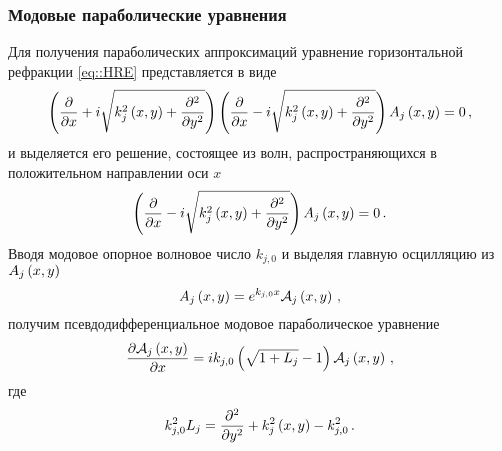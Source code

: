 \documentclass[../document.tex]{subfiles}
\begin{document}
        \subsubsection{Модовые параболические уравнения}
            \par Для получения параболических аппроксимаций уравнение горизонтальной рефракции \eqref{eq::HRE} представляется в виде
            \begin{equation}
                \left(\frac{\partial}{\partial x}+i\sqrt{k_j^2\left(x,y\right)+\frac{\partial^2}{\partial y^2}}\right)\left(\frac{\partial}{\partial x}-i\sqrt{k_j^2\left(x,y\right)+\frac{\partial^2}{\partial y^2}}\right)A_j\left(x,y\right)=0\,,
            \end{equation}
            и выделяется его решение, состоящее из волн, распространяющихся в положительном направлении оси $x$
            \begin{equation}
                \left(\frac{\partial}{\partial x}-i\sqrt{k_j^2\left(x,y\right)+\frac{\partial^2}{\partial y^2}}\right)A_j\left(x,y\right)=0\,.
            \end{equation}
            Вводя модовое опорное волновое число $k_{j,0}$ и выделяя главную осцилляцию из $A_j\left(x,y\right)$
            \begin{equation}
                A_j\left(x,y\right)=e^{k_{j,0}x}\mathcal{A}_j\left(x,y\right)\,,\nonumber
            \end{equation}
            получим псевдодифференциальное модовое параболическое уравнение
            \begin{equation}\label{eq::PDMPE}
                \frac{\partial\mathcal{A}_j\left(x,y\right)}{\partial x}=ik_{j,0}\left(\sqrt{1+L_j}-1\right)\mathcal{A}_j\left(x,y\right)\,,
            \end{equation}
            где 
            \begin{equation}
                k_{j,0}^2L_j=\frac{\partial^2}{\partial y^2}+k_j^2\left(x,y\right)-k_{j,0}^2\,.\nonumber
            \end{equation}
\end{document}
